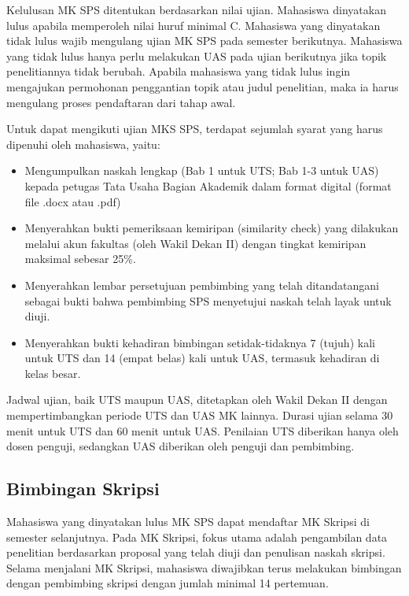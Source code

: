 \documentclass[
  indonesian,
  letterpaper,
]{scrbook}
\providecommand{\tightlist}{%
  \setlength{\itemsep}{0pt}\setlength{\parskip}{0pt}}
\begin{document}
Kelulusan MK SPS ditentukan berdasarkan nilai ujian. Mahasiswa
dinyatakan lulus apabila memperoleh nilai huruf minimal C. Mahasiswa
yang dinyatakan tidak lulus wajib mengulang ujian MK SPS pada semester
berikutnya. Mahasiswa yang tidak lulus hanya perlu melakukan UAS pada
ujian berikutnya jika topik penelitiannya tidak berubah. Apabila
mahasiswa yang tidak lulus ingin mengajukan permohonan penggantian topik
atau judul penelitian, maka ia harus mengulang proses pendaftaran dari
tahap awal.

Untuk dapat mengikuti ujian MKS SPS, terdapat sejumlah syarat yang harus
dipenuhi oleh mahasiswa, yaitu:

\begin{itemize}
\tightlist
\item
  Mengumpulkan naskah lengkap (Bab 1 untuk UTS; Bab 1-3 untuk UAS)
  kepada petugas Tata Usaha Bagian Akademik dalam format digital (format
  file .docx atau .pdf)
\item
  Menyerahkan bukti pemeriksaan kemiripan (similarity check) yang
  dilakukan melalui akun fakultas (oleh Wakil Dekan II) dengan tingkat
  kemiripan maksimal sebesar 25\%.
\item
  Menyerahkan lembar persetujuan pembimbing yang telah ditandatangani
  sebagai bukti bahwa pembimbing SPS menyetujui naskah telah layak untuk
  diuji.
\item
  Menyerahkan bukti kehadiran bimbingan setidak-tidaknya 7 (tujuh) kali
  untuk UTS dan 14 (empat belas) kali untuk UAS, termasuk kehadiran di
  kelas besar.
\end{itemize}

Jadwal ujian, baik UTS maupun UAS, ditetapkan oleh Wakil Dekan II dengan
mempertimbangkan periode UTS dan UAS MK lainnya. Durasi ujian selama 30
menit untuk UTS dan 60 menit untuk UAS. Penilaian UTS diberikan hanya
oleh dosen penguji, sedangkan UAS diberikan oleh penguji dan pembimbing.

\subsection*{Bimbingan Skripsi}\label{bimbingan-skripsi}

Mahasiswa yang dinyatakan lulus MK SPS dapat mendaftar MK Skripsi di
semester selanjutnya. Pada MK Skripsi, fokus utama adalah pengambilan
data penelitian berdasarkan proposal yang telah diuji dan penulisan
naskah skripsi. Selama menjalani MK Skripsi, mahasiswa diwajibkan terus
melakukan bimbingan dengan pembimbing skripsi dengan jumlah minimal 14
pertemuan.
\end{document}
